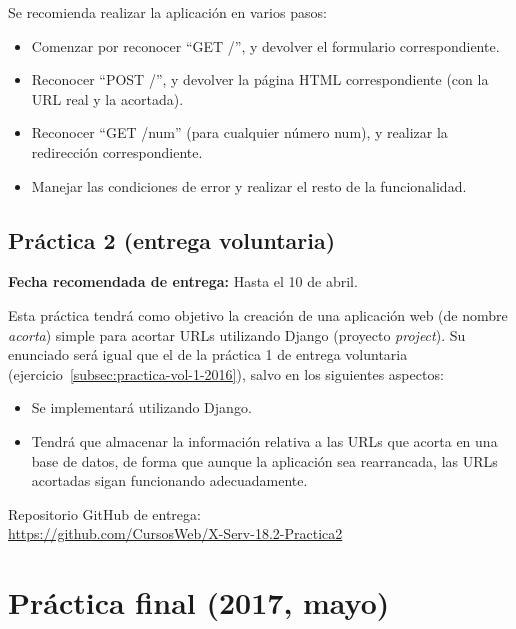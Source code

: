 Se recomienda realizar la aplicación en varios pasos:

\begin{itemize}
\item Comenzar por reconocer ``GET /'', y devolver el formulario correspondiente.
\item Reconocer ``POST /'', y devolver la página HTML correspondiente (con la URL real y la acortada).
\item Reconocer ``GET /num'' (para cualquier número num), y realizar la redirección correspondiente.
\item Manejar las condiciones de error y realizar el resto de la funcionalidad.
\end{itemize}

\subsection{Práctica 2 (entrega voluntaria)}
\label{subsec:practica-vol-2-2015}

\textbf{Fecha recomendada de entrega:} Hasta el 10 de abril.

Esta práctica tendrá como objetivo la creación de una aplicación web (de nombre \emph{acorta}) simple para acortar URLs utilizando Django (proyecto \emph{project}). Su enunciado será igual que el de la práctica 1 de entrega voluntaria (ejercicio~\ref{subsec:practica-vol-1-2016}), salvo en los siguientes aspectos:

\begin{itemize}
  \item Se implementará utilizando Django.
  \item Tendrá que almacenar la información relativa a las URLs que acorta en una base de datos, de forma que aunque la aplicación sea rearrancada, las URLs acortadas sigan funcionando adecuadamente.
\end{itemize}

Repositorio GitHub de entrega: \\
\url{https://github.com/CursosWeb/X-Serv-18.2-Practica2}

\newpage

\section{Práctica final (2017, mayo)}
\label{practica-final-2017-05}

